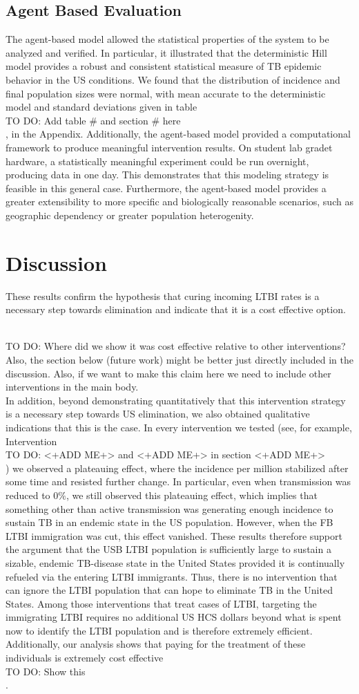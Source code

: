 \documentclass{amsart}
\newcommand{\TODO}[1]{\hfill\\{\huge \color{red} TO DO:} #1 \hfill \\}
\begin{document}
\subsection{Agent Based Evaluation}
The agent-based model allowed the statistical properties of the system to be
analyzed and verified. In particular, it illustrated that the deterministic
Hill model provides a robust and consistent statistical measure of TB epidemic
behavior in the US conditions. We found that the distribution of incidence and
final population sizes were normal, with mean accurate to the deterministic
model and standard deviations given in table 
\TODO{Add table \# and section \# here}
, in the Appendix. Additionally, the agent-based model provided a computational
framework to produce meaningful intervention results. On student lab gradet
hardware, a statistically meaningful experiment could be run overnight,
producing data in one day. This demonstrates that this modeling strategy is
feasible in this general case.  Furthermore, the agent-based model provides a
greater extensibility to more specific and biologically reasonable scenarios,
such as geographic dependency or greater population heterogenity.  

\section{Discussion}
These results confirm the hypothesis that curing incoming LTBI rates is a
necessary step towards elimination and indicate that it is a cost effective
option. 

\TODO{Where did we show it was cost effective relative to other interventions?
  Also, the section below (future work) might be better just directly included
  in the discussion. Also, if we want to make this claim here we need to include
  other interventions in the main body.
}
In addition, beyond demonstrating quantitatively that this intervention strategy
is a necessary step towards US elimination, we also obtained qualitative
indications that this is the case. In every intervention we tested (see, for
example, Intervention \TODO{<+ADD ME+> and <+ADD ME+> in section <+ADD ME+>}) we
observed a plateauing effect, where the incidence per million stabilized after
some time and resisted further change. In particular, even when transmission was
reduced to $0\%$, we still observed this plateauing effect, which implies that
something other than active transmission was generating enough incidence to
sustain TB in an endemic state in the US population. However, when the FB LTBI
immigration was cut, this effect vanished. These results therefore support the
argument that the USB LTBI population is sufficiently large to sustain a
sizable, endemic TB-disease state in the United States provided it is
continually refueled via the entering LTBI immigrants. Thus, there is no
intervention that can ignore the LTBI population that can hope to eliminate TB
in the United States. Among those interventions that treat cases of LTBI,
targeting the immigrating LTBI requires no additional US HCS dollars beyond what
is spent now to identify the LTBI population and is therefore extremely
efficient. Additionally, our analysis shows that paying for the treatment of
these individuals is extremely cost effective 
\TODO{Show this}.
\end{document}
